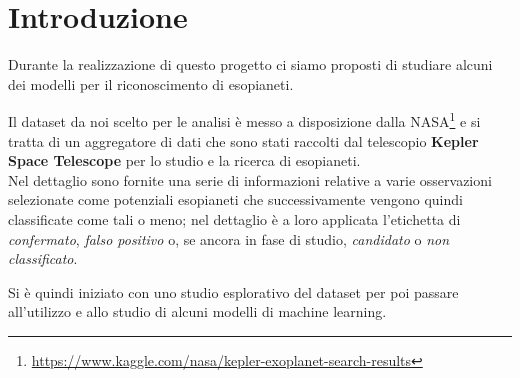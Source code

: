 \chapter{Introduzione}
Durante la realizzazione di questo progetto ci siamo proposti di studiare 
alcuni dei modelli per il riconoscimento di esopianeti. 

Il dataset da noi scelto per le analisi è messo a disposizione dalla 
NASA\footnote{\href{https://www.kaggle.com/nasa/kepler-exoplanet-search-results}
{https://www.kaggle.com/nasa/kepler-exoplanet-search-results}} e si tratta di un
aggregatore di dati che sono stati raccolti dal telescopio \textbf{Kepler Space Telescope} 
per lo studio e la ricerca di esopianeti. \\
Nel dettaglio sono fornite una serie di informazioni relative a varie osservazioni
selezionate come potenziali esopianeti che successivamente vengono quindi 
classificate come tali o meno; nel dettaglio è a loro 
applicata l'etichetta di \textit{confermato}, \textit{falso positivo} o, se ancora 
in fase di studio, \textit{candidato} o \textit{non classificato}.

Si è quindi iniziato con uno studio esplorativo del dataset per poi passare all'utilizzo
e allo studio di alcuni modelli di machine learning.
